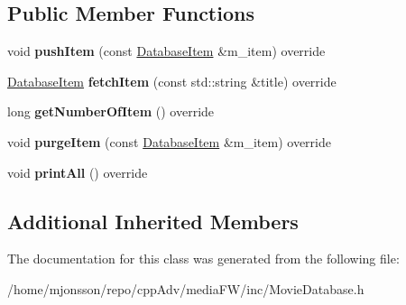 \subsection*{Public Member Functions}
\begin{DoxyCompactItemize}
\item 
\mbox{\label{classMovieDatabase_a203b9b5c1b325997ce519859a436b6ce}} 
void {\bfseries push\+Item} (const \hyperlink{classDatabaseItem}{Database\+Item} \&m\+\_\+item) override
\item 
\mbox{\label{classMovieDatabase_ac0bb39b8be599ffea76081809ae42dda}} 
\hyperlink{classDatabaseItem}{Database\+Item} {\bfseries fetch\+Item} (const std\+::string \&title) override
\item 
\mbox{\label{classMovieDatabase_a9a386f51dd72d63414a124cbcfcd879b}} 
long {\bfseries get\+Number\+Of\+Item} () override
\item 
\mbox{\label{classMovieDatabase_a85faa4c33b3ab2dc0d1f4939bb034797}} 
void {\bfseries purge\+Item} (const \hyperlink{classDatabaseItem}{Database\+Item} \&m\+\_\+item) override
\item 
\mbox{\label{classMovieDatabase_af1e13b6fc0fd7186e98edbe2cf187618}} 
void {\bfseries print\+All} () override
\end{DoxyCompactItemize}
\subsection*{Additional Inherited Members}


The documentation for this class was generated from the following file\+:\begin{DoxyCompactItemize}
\item 
/home/mjonsson/repo/cpp\+Adv/media\+F\+W/inc/Movie\+Database.\+h\end{DoxyCompactItemize}

